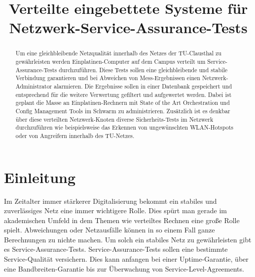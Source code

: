 \documentclass[conference]{IEEEtran}
\begin{document}
\title{Verteilte eingebettete Systeme für Netzwerk-Service-Assurance-Tests}
\author{
}

\maketitle

\begin{abstract}
    Um eine gleichbleibende Netzqualität innerhalb des Netzes der
    TU-Clausthal zu gewährleisten werden Einplatinen-Computer auf dem
    Campus verteilt um Service-Assurance-Tests durchzuführen. Diese
    Tests sollen eine gleichbleibende und stabile Verbindung garantieren
    und bei Abweichen von Mess-Ergebnissen einen Netzwerk-Administrator
    alarmieren. Die Ergebnisse sollen in einer Datenbank gespeichert und
    entsprechend für die weitere Verwertung gefiltert und aufgewertet
    werden. Dabei ist geplant die Masse an Einplatinen-Rechnern mit
    State of the Art Orchestration und Config Management Tools im
    Schwarm zu administrieren. Zusätzlich ist es denkbar über diese
    verteilten Netzwerk-Knoten diverse Sicherheits-Tests im Netzwerk
    durchzuführen wie beispielsweise das Erkennen von ungewünschten
    WLAN-Hotspots oder von Angreifern innerhalb des TU-Netzes.
\end{abstract}

\IEEEpeerreviewmaketitle

\section{Einleitung}
Im Zeitalter immer stärkerer Digitalisierung bekommt ein stabiles und
zuverlässiges Netz eine immer wichtigere Rolle. Dies spürt man gerade im
akademischen Umfeld in dem Themen wie verteiltes Rechnen eine große
Rolle spielt. Abweichungen oder Netzausfälle können in so einem Fall
ganze Berechnungen zu nichte machen. Um solch ein stabiles Netz zu
gewährleisten gibt es Service-Assurance-Tests. Service-Assurance-Tests
sollen eine bestimmte Service-Qualität versichern. Dies kann anfangen
bei einer Uptime-Garantie, über eine Bandbreiten-Garantie bis zur
Überwachung von Service-Level-Agreements.
\end{document}
